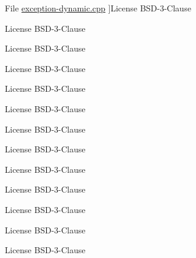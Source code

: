 \begin{DoxyRefList}
%
File \hyperlink{exception-dynamic_8cpp}{exception-\/dynamic.cpp} ]License B\+S\+D-\/3-\/\+Clause  
\item[\label{license__license000007}%
\Hypertarget{license__license000007}%
File \hyperlink{exception-dynamic_8hh}{exception-\/dynamic.hh} ]License B\+S\+D-\/3-\/\+Clause  
\item[\label{license__license000046}%
\Hypertarget{license__license000046}%
File \hyperlink{exception-factory_8cpp}{exception-\/factory.cpp} ]License B\+S\+D-\/3-\/\+Clause  
\item[\label{license__license000008}%
\Hypertarget{license__license000008}%
File \hyperlink{exception-factory_8hh}{exception-\/factory.hh} ]License B\+S\+D-\/3-\/\+Clause  
\item[\label{license__license000047}%
\Hypertarget{license__license000047}%
File \hyperlink{exception-feature_8cpp}{exception-\/feature.cpp} ]License B\+S\+D-\/3-\/\+Clause  
\item[\label{license__license000009}%
\Hypertarget{license__license000009}%
File \hyperlink{exception-feature_8hh}{exception-\/feature.hh} ]License B\+S\+D-\/3-\/\+Clause  
\item[\label{license__license000048}%
\Hypertarget{license__license000048}%
File \hyperlink{exception-signal_8cpp}{exception-\/signal.cpp} ]License B\+S\+D-\/3-\/\+Clause  
\item[\label{license__license000010}%
\Hypertarget{license__license000010}%
File \hyperlink{exception-signal_8hh}{exception-\/signal.hh} ]License B\+S\+D-\/3-\/\+Clause  
\item[\label{license__license000049}%
\Hypertarget{license__license000049}%
File \hyperlink{exception-task_8cpp}{exception-\/task.cpp} ]License B\+S\+D-\/3-\/\+Clause  
\item[\label{license__license000011}%
\Hypertarget{license__license000011}%
File \hyperlink{exception-task_8hh}{exception-\/task.hh} ]License B\+S\+D-\/3-\/\+Clause  
\item[\label{license__license000050}%
\Hypertarget{license__license000050}%
File \hyperlink{exception-tools_8cpp}{exception-\/tools.cpp} ]License B\+S\+D-\/3-\/\+Clause  
\item[\label{license__license000012}%
\Hypertarget{license__license000012}%
File \hyperlink{exception-tools_8hh}{exception-\/tools.hh} ]License B\+S\+D-\/3-\/\+Clause  
\item[\label{license__license000051}%
\Hypertarget{license__license000051}%
File \hyperlink{exception-yaml-cpp_8cpp}{exception-\/yaml-\/cpp.cpp} ]License B\+S\+D-\/3-\/\+Clause  

\end{DoxyRefList}
